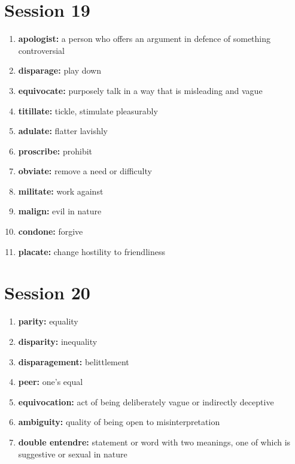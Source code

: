 \documentclass{article}
\begin{document}
\section{Session 19}
\begin{enumerate}
    \item \textbf{apologist: }{a person who offers an argument in defence of something controversial}
    \item \textbf{disparage: }{play down}
    \item \textbf{equivocate: }{purposely talk in a way that is misleading and vague}
    \item \textbf{titillate: }{tickle, stimulate pleasurably}
    \item \textbf{adulate: }{flatter lavishly}
    \item \textbf{proscribe: }{prohibit}
    \item \textbf{obviate: }{remove a need or difficulty}
    \item \textbf{militate: }{work against}
    \item \textbf{malign: }{evil in nature}
    \item \textbf{condone: }{forgive}
    \item \textbf{placate: }{change hostility to friendliness}
    
\end{enumerate}

\section{Session 20}
\begin{enumerate}
    \item \textbf{parity: }{equality}
    \item \textbf{disparity: }{inequality}
    \item \textbf{disparagement: }{belittlement}
    \item \textbf{peer: }{one's equal}
    \item \textbf{equivocation: }{act of being deliberately vague or indirectly deceptive}
    \item \textbf{ambiguity: }{quality of being open to misinterpretation}
    \item \textbf{double entendre: }{statement or word with two meanings, one of which is suggestive or sexual in nature}
    
\end{enumerate}
\end{document}
